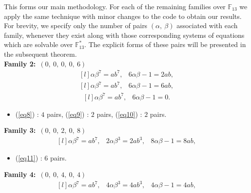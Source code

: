 \documentclass[12pt,a4wide, reqno]{amsart}
\theoremstyle{definition}
\theoremstyle{remark}
\numberwithin{equation}{section}
\begin{document}
This forms our main methodology. For each of the remaining families over $\mathbb{F}_{13}$ we apply the same technique with minor changes to the code to obtain our results. For brevity, we specify only the number of pairs $(\alpha,~\beta)$ associated with each family, whenever they exist along with those corresponding systems of equations which are solvable over $\mathbb{F}_{13}^*.$ The explicit forms of these pairs will be presented in the subsequent theorem.
\vspace{0.3 cm}\\
\textbf{Family 2:}~$(0,~0,~0,~0,~6)$ 
\begin{equation}\label{eq8}
    \begin{matrix*}[l]
         \alpha \beta ^7=ab^7, & 6\alpha \beta -1=2ab,
    \end{matrix*}
\end{equation}
\begin{equation}\label{eq9}
    \begin{matrix*}[l]
         \alpha \beta ^7=ab^7, & 6\alpha \beta -1=6ab,
    \end{matrix*}
\end{equation}
\begin{equation}\label{eq10}
    \begin{matrix*}[l]
         \alpha \beta ^7=ab^7, & 6\alpha \beta -1=0.
    \end{matrix*}
\end{equation}
\begin{itemize}
    \item 
    (\ref{eq8}) : $4$ pairs, (\ref{eq9}) : $2$ pairs,  (\ref{eq10}) : $2$ pairs.
\end{itemize}
\textbf{Family 3:}~$(0,~0,~2,~0,~8)$ 
\begin{equation}\label{eq11}
    \begin{matrix*}[l]
         \alpha \beta ^7=ab^7, & 2\alpha \beta^3=2ab^3, & 8\alpha\beta -1=8ab,
    \end{matrix*}
\end{equation}
\begin{itemize}
    \item 
    (\ref{eq11}) : $6$ pairs.
\end{itemize}
\textbf{Family 4:}~$(0,~0,~4,~0,~4)$ 
\begin{equation}\label{eq15}
    \begin{matrix*}[l]
        \alpha \beta ^7=ab^7, & 4\alpha \beta^3=4ab^3, & 4\alpha\beta -1=4ab,
    \end{matrix*}
\end{equation}
\end{document}
